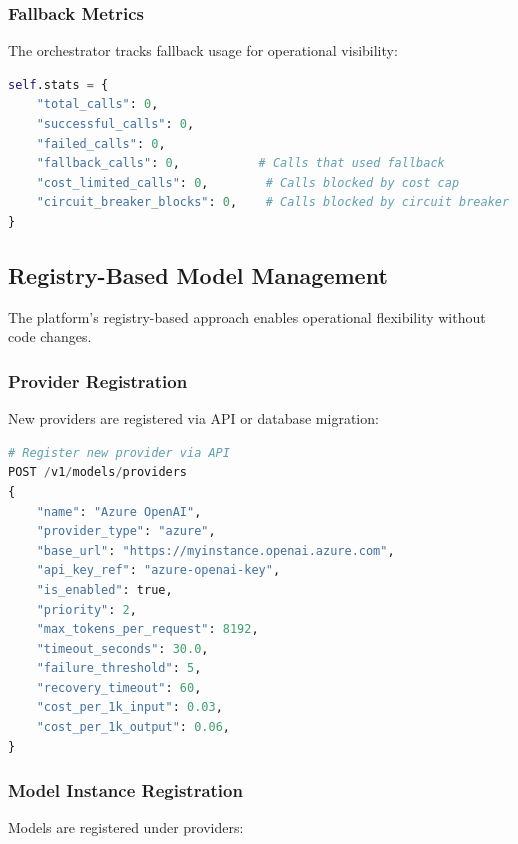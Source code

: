 \subsubsection{Fallback Metrics}

The orchestrator tracks fallback usage for operational visibility:

\begin{lstlisting}[language=Python, caption={Fallback metrics}, label=lst:fallback-metrics]
self.stats = {
    "total_calls": 0,
    "successful_calls": 0,
    "failed_calls": 0,
    "fallback_calls": 0,           # Calls that used fallback
    "cost_limited_calls": 0,        # Calls blocked by cost cap
    "circuit_breaker_blocks": 0,    # Calls blocked by circuit breaker
}
\end{lstlisting}

\subsection{Registry-Based Model Management}
\label{subsec:registry-model-management}

The platform's registry-based approach enables operational flexibility without code changes.

\subsubsection{Provider Registration}

New providers are registered via API or database migration:

\begin{lstlisting}[language=Python, caption={Provider registration}, label=lst:provider-registration]
# Register new provider via API
POST /v1/models/providers
{
    "name": "Azure OpenAI",
    "provider_type": "azure",
    "base_url": "https://myinstance.openai.azure.com",
    "api_key_ref": "azure-openai-key",
    "is_enabled": true,
    "priority": 2,
    "max_tokens_per_request": 8192,
    "timeout_seconds": 30.0,
    "failure_threshold": 5,
    "recovery_timeout": 60,
    "cost_per_1k_input": 0.03,
    "cost_per_1k_output": 0.06,
}
\end{lstlisting}

\subsubsection{Model Instance Registration}

Models are registered under providers:

